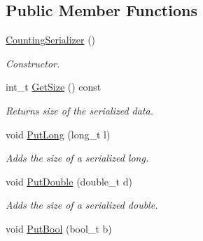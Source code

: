 \subsection*{Public Member Functions}
\begin{DoxyCompactItemize}
\item 
\hypertarget{class_common_1_1_counting_serializer_a3bb6f8ba82a236ee5b2d7fc607c233f0}{\hyperlink{class_common_1_1_counting_serializer_a3bb6f8ba82a236ee5b2d7fc607c233f0}{Counting\-Serializer} ()}\label{class_common_1_1_counting_serializer_a3bb6f8ba82a236ee5b2d7fc607c233f0}

\begin{DoxyCompactList}\small\item\em Constructor. \end{DoxyCompactList}\item 
\hypertarget{class_common_1_1_counting_serializer_abc66a0949ecaaa9360362ea3953a0d28}{int\-\_\-t \hyperlink{class_common_1_1_counting_serializer_abc66a0949ecaaa9360362ea3953a0d28}{Get\-Size} () const }\label{class_common_1_1_counting_serializer_abc66a0949ecaaa9360362ea3953a0d28}

\begin{DoxyCompactList}\small\item\em Returns size of the serialized data. \end{DoxyCompactList}\item 
\hypertarget{class_common_1_1_counting_serializer_a3a145969a44e30ab60ee7812bbf45565}{void \hyperlink{class_common_1_1_counting_serializer_a3a145969a44e30ab60ee7812bbf45565}{Put\-Long} (long\-\_\-t l)}\label{class_common_1_1_counting_serializer_a3a145969a44e30ab60ee7812bbf45565}

\begin{DoxyCompactList}\small\item\em Adds the size of a serialized long. \end{DoxyCompactList}\item 
\hypertarget{class_common_1_1_counting_serializer_ab86f94e82c32e509e8ed1fe8e53340a8}{void \hyperlink{class_common_1_1_counting_serializer_ab86f94e82c32e509e8ed1fe8e53340a8}{Put\-Double} (double\-\_\-t d)}\label{class_common_1_1_counting_serializer_ab86f94e82c32e509e8ed1fe8e53340a8}

\begin{DoxyCompactList}\small\item\em Adds the size of a serialized double. \end{DoxyCompactList}\item 
\hypertarget{class_common_1_1_counting_serializer_a7a164188af395346b5de36a2f8e5b5ce}{void \hyperlink{class_common_1_1_counting_serializer_a7a164188af395346b5de36a2f8e5b5ce}{Put\-Bool} (bool\-\_\-t b)}\label{class_common_1_1_counting_serializer_a7a164188af395346b5de36a2f8e5b5ce}


\end{DoxyCompactItemize}
